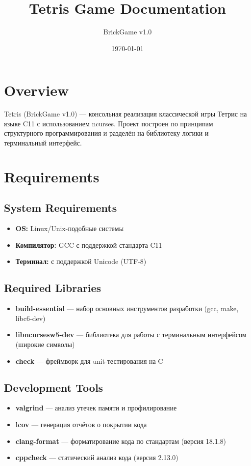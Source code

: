 \documentclass{article}
\title{Tetris Game Documentation}
\author{BrickGame v1.0}
\date{\today}
\begin{document}
\maketitle

\section{Overview}
Tetris (BrickGame v1.0) — консольная реализация классической игры Тетрис на языке C11 с использованием ncurses. Проект построен по принципам структурного программирования и разделён на библиотеку логики и терминальный интерфейс.

\section{Requirements}
\subsection{System Requirements}
\begin{itemize}
  \item \textbf{OS:} Linux/Unix-подобные системы
  \item \textbf{Компилятор:} GCC с поддержкой стандарта C11
  \item \textbf{Терминал:} с поддержкой Unicode (UTF-8)
\end{itemize}

\subsection{Required Libraries}
\begin{itemize}
  \item \textbf{build-essential} — набор основных инструментов разработки (gcc, make, libc6-dev)
  \item \textbf{libncursesw5-dev} — библиотека для работы с терминальным интерфейсом (широкие символы)
  \item \textbf{check} — фреймворк для unit-тестирования на C
\end{itemize}

\subsection{Development Tools}
\begin{itemize}
  \item \textbf{valgrind} — анализ утечек памяти и профилирование
  \item \textbf{lcov} — генерация отчётов о покрытии кода
  \item \textbf{clang-format} — форматирование кода по стандартам (версия 18.1.8)
  \item \textbf{cppcheck} — статический анализ кода (версия 2.13.0)
\end{itemize}
\end{document}
